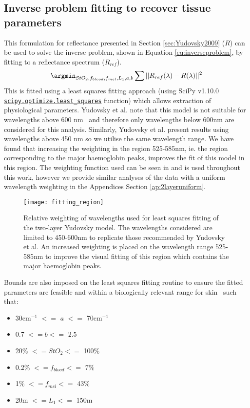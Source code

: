 \subsection{Inverse problem fitting to recover tissue parameters}\label{sec:methodinverse}
This formulation for reflectance presented in Section \ref{sec:Yudovsky2009} ($R$) can be used to solve the inverse problem, shown in Equation \eqref{eq:inverseproblem}, by fitting to a reflectance spectrum ($R_{ref}$). 
\begin{equation}
    \argmin_{StO_2, f_{blood}, f_{mel}, L_1, a, b} \sum || R_{ref}(\lambda) - R(\lambda) ||^2
    \label{eq:inverseproblem}
\end{equation}
This is fitted using a least squares fitting approach (using SciPy v1.10.0  \newline \href{https://docs.scipy.org/doc/scipy/reference/generated/scipy.optimize.least_squares.html}{\texttt{scipy.optimize.least\_squares}} function) which allows extraction of physiological parameters. 
Yudovsky et al. note that this model is not suitable for wavelengths above 600 nm~\cite{Yudovsky2011a} and therefore only wavelengths below 600nm are considered for this analysis. Similarly, Yudovsky et al. present results using wavelengths above 450 nm so we utilise the same wavelength range. We have found that increasing the weighting in the region 525-585nm, ie. the region corresponding to the major haemoglobin peaks, improves the fit of this model in this region. The weighting function used can be seen in  and is used throughout this work, however we provide similar analyses of the data with a uniform wavelength weighting in the Appendices Section \ref{ap:2layeruniform}. 
\begin{figure}
    \centering
    \texttt{[image: fitting\_region]}
    \caption{Relative weighting of wavelengths used for least squares fitting of the two-layer Yudovsky model. The wavelengths considered are limited to 450-600nm to replicate those recommended by Yudovsky et al. An increased weighting is placed on the wavelength range 525-585nm to improve the visual fitting of this region which contains the major haemoglobin peaks.}
    \label{fig:weighting}
\end{figure}
Bounds are also imposed on the least squares fitting routine to ensure the fitted parameters are feasible and within a biologically relevant range for skin~\cite{Yudovsky2009, Jacques2013} such that:
\begin{itemize}
    \item 30cm$^{-1}$ $<=$ $a$ $<=$ 70cm$^{-1}$
    \item 0.7 $<= b <=$ 2.5
    \item 20\% $<= StO_2 <=$ 100\%
    \item 0.2\% $<= f_{blood} <=$ 7\% 
    \item 1\% $<= f_{mel} <=$ 43\% 
    \item 20{\textmu}m $<= L_1 <=$ 150{\textmu}m
\end{itemize}
